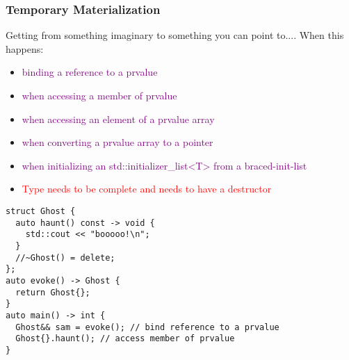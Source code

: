 \documentclass[main.tex,fontsize=8pt,paper=a4,paper=portrait,DIV=calc,]{scrartcl}
\begin{document}
\subsubsection{Temporary Materialization}
Getting from something imaginary to something you can point to....\newline
When this happens:\newline
\begin{itemize}
\item \textcolor{purple}{binding a reference to a prvalue}
\item \textcolor{purple}{when accessing a member of prvalue}
\item \textcolor{purple}{when accessing an element of a prvalue array}
\item \textcolor{purple}{when converting a prvalue array to a pointer}
\item \textcolor{purple}{when initializing an std::initializer\_list<T> from a braced-init-list}
\item \textcolor{red}{Type needs to be complete and needs to have a destructor}
\end{itemize} 
\begin{lstlisting}
struct Ghost {
  auto haunt() const -> void {
    std::cout << "booooo!\n";
  }
  //~Ghost() = delete;
};
auto evoke() -> Ghost {
  return Ghost{};
}
auto main() -> int {
  Ghost&& sam = evoke(); // bind reference to a prvalue
  Ghost{}.haunt(); // access member of prvalue
}
\end{lstlisting}
\end{document}
